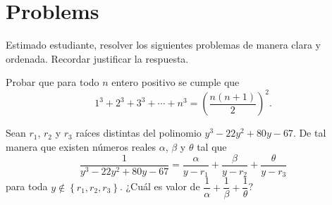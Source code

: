 \section*{Problems}

Estimado estudiante, resolver los siguientes problemas de manera clara y ordenada.
Recordar justificar la respuesta.
\\
\hline

\begin{prob}
    Probar que para todo $n$ entero positivo se cumple que
    \[
        1^3 + 2^3 + 3^3  + \cdots + n^3 = \left(\frac{n (n + 1)}{2}\right)^2.
    \]
\end{prob}

\begin{prob}
    Sean $r_1$, $r_2$ y $r_3$ raíces distintas del polinomio $y^3 - 22 y^2 + 80 y - 67$.
    De tal manera que existen números reales $\alpha$, $\beta$ y $\theta$ tal que
    \[
        \frac{1}{y^3 - 22 y^2 + 80 y - 67} = \frac{\alpha}{y - r_1} + \frac{\beta}{y - r_2} + \frac{\theta}{y - r_3}
    \]
    para toda $y \notin \left\{ r_1, r_2, r_3 \right\}$.
    ¿Cuál es valor de $\dfrac{1}{\alpha} + \dfrac{1}{\beta} + \dfrac{1}{\theta}$?
\end{prob}

\hline